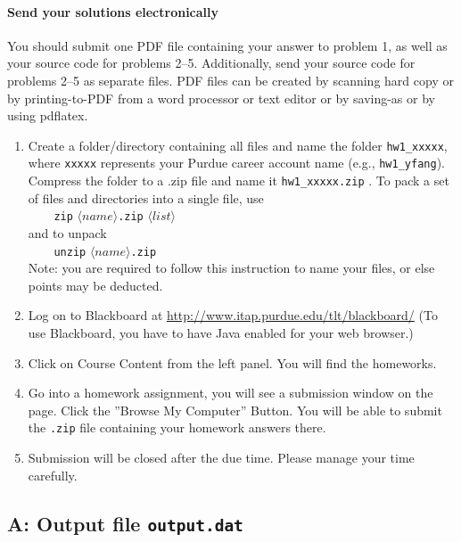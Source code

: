 \documentclass[11pt]{article}
\begin{document}
\paragraph{Send your solutions electronically}
You should submit one PDF file containing your
answer to problem 1, as well as your source code for problems 2--5.
Additionally,
send your source code for problems 2--5 as separate files.
PDF files can be created by scanning hard copy or by printing-to-PDF
from a word processor or text editor or by saving-as or
by using pdflatex.
\begin{enumerate}
\item Create a folder/directory containing all files and name the folder
 {\tt hw1\_xxxxx}, where {\tt xxxxx} represents your Purdue career account name
 (e.g., {\tt hw1\_yfang}). Compress the folder to a .zip file and name it  {\tt hw1\_xxxxx.zip} .
 To pack a set of files and directories into a single file, use \\
\verb|    zip| $\langle\mathit{name}\rangle$\verb|.zip|
 $\langle\mathit{list}\rangle$ \\
and to unpack \\
\verb|    unzip| $\langle\mathit{name}\rangle$\verb|.zip| \\

Note: you are required to follow this instruction to name your files,
or else points may be deducted.
\item Log on to Blackboard at
 \url{http://www.itap.purdue.edu/tlt/blackboard/}
  (To use Blackboard, you have to have Java enabled for your web browser.)
\item Click on Course Content from the left panel. You will find the homeworks.
\item Go into a homework assignment, you will see a submission window on the
page. Click
the ''Browse My Computer'' Button.
 You will be able to submit the {\tt .zip} file
containing your homework answers there.
\item Submission will be closed after the due time.
 Please manage your time carefully.
\end{enumerate}

\appendix

\subsection*{A: Output file {\tt output.dat}}


\end{document}
